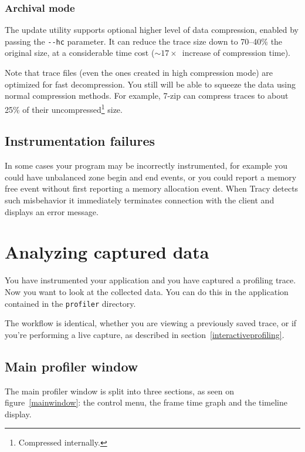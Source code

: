 \documentclass[hidelinks,titlepage,a4paper]{article}
\begin{document}
\subsubsection{Archival mode}

The update utility supports optional higher level of data compression, enabled by passing the \texttt{-{}-hc} parameter. It can reduce the trace size down to \numrange{70}{40}\% the original size, at a considerable time cost ($\sim17\times$~increase of compression time).

Note that trace files (even the ones created in high compression mode) are optimized for fast decompression. You still will be able to squeeze the data using normal compression methods. For example, 7-zip can compress traces to about 25\% of their uncompressed\footnote{Compressed internally.} size.

\subsection{Instrumentation failures}
\label{instrumentationfailures}

In some cases your program may be incorrectly instrumented, for example you could have unbalanced zone begin and end events, or you could report a memory free event without first reporting a memory allocation event. When Tracy detects such misbehavior it immediately terminates connection with the client and displays an error message.

\section{Analyzing captured data}
\label{analyzingdata}

You have instrumented your application and you have captured a profiling trace. Now you want to look at the collected data. You can do this in the application contained in the \texttt{profiler} directory.

The workflow is identical, whether you are viewing a previously saved trace, or if you're performing a live capture, as described in section~\ref{interactiveprofiling}.

\subsection{Main profiler window}

The main profiler window is split into three sections, as seen on figure~\ref{mainwindow}: the control menu, the frame time graph and the timeline display.
\end{document}
